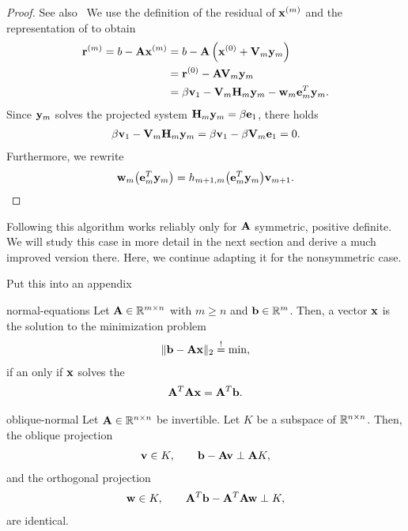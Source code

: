 \begin{proof}
  See also~\cite[Proposition 6.7]{Saad00}
  We use the definition of the residual of $\mathbf x^{(m)}$ and the representation of  to obtain
  \begin{align}
    \mathbf r^{(m)} = b-\mathbf A\mathbf x^{(m)}
    &= b- \mathbf A\left(\mathbf x^{(0)} + \mathbf V_m\mathbf y_m\right)\\
    &=\mathbf r^{(0)} - \mathbf A\mathbf V_m\mathbf y_m\\
    &= \beta\mathbf v_1 - \mathbf V_m\mathbf H_m\mathbf y_m - \mathbf w_m\mathbf e_m^T\mathbf y_m.
  \end{align}
  Since $\mathbf y_m$ solves the projected system
  $\mathbf H_m\mathbf y_m = \beta\mathbf e_1$, there holds
  \begin{gather}
    \beta\mathbf v_1 - \mathbf V_m\mathbf H_m\mathbf y_m = \beta\mathbf v_1 - \beta \mathbf V_m\mathbf e_1 = 0.
  \end{gather}
  Furthermore, we rewrite
  \begin{gather}
    \mathbf w_m\bigl(\mathbf e_m^T\mathbf y_m\bigr) = h_{m+1,m} \bigl(\mathbf e_m^T\mathbf y_m\bigr) \mathbf v_{m+1}.
  \end{gather}
\end{proof}

\begin{remark}
  Following  this algorithm
  works reliably only for $\mathbf A$ symmetric, positive definite. We
  will study this case in more detail in the next section and derive a
  much improved version there. Here, we continue adapting it for the
  nonsymmetric case.
\end{remark}

\begin{todo}
  Put this into an appendix
\end{todo}

\begin{Theorem}{normal-equations}
  Let $\mathbf A\in\mathbb R^{m\times n}$ with $m\ge n$ and $\mathbf b\in\mathbb R^m$. Then, a vector $\mathbf x$ is the solution to the minimization problem
  \begin{gather}
    \lVert\mathbf b-\mathbf A\mathbf x\rVert_2 \stackrel{!}{=} \min,
  \end{gather}
  if an only if $\mathbf x$ solves the 
  \begin{gather}
    \mathbf A^T\mathbf A\mathbf x = \mathbf A^T \mathbf b.
  \end{gather}
\end{Theorem}

\begin{Lemma}{oblique-normal}
  Let $\mathbf A\in\mathbb R^{n\times n}$ be invertible. Let $K$ be a subspace of $\mathbb R^{n\times n}$. Then, the oblique projection
  \begin{gather}
    \mathbf v\in K, \qquad \mathbf b-\mathbf A\mathbf v \perp \mathbf A K,
  \end{gather}
  and the orthogonal projection
  \begin{gather}
    \mathbf w\in K, \qquad \mathbf A^T \mathbf b-\mathbf A^T\mathbf A\mathbf w \perp K,
  \end{gather}
  are identical.
\end{Lemma}

